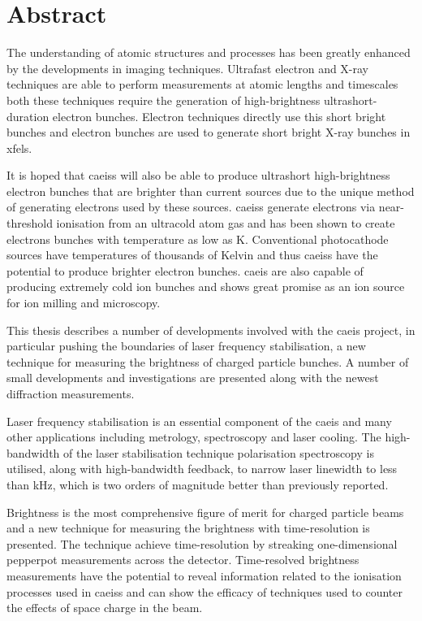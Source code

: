 \chapter*{Abstract}

The understanding of atomic structures and processes has been greatly enhanced by the developments in imaging techniques.
Ultrafast electron and X-ray techniques are able to perform measurements at atomic lengths and timescales both these techniques require the generation of high-brightness ultrashort-duration electron bunches.
Electron techniques directly use this short bright bunches and electron bunches are used to generate short bright X-ray bunches in \glspl{xfel}.

It is hoped that \glspl{caeis} will also be able to produce ultrashort high-brightness electron bunches that are brighter than current sources due to the unique method of generating electrons used by these sources.
\Glspl{caeis} generate electrons via near-threshold ionisation from an ultracold atom gas and has been shown to create electrons bunches with temperature as low as \unit[10]{K}.
Conventional photocathode sources have temperatures of thousands of Kelvin and thus \glspl{caeis} have the potential to produce brighter electron bunches.
\Gls{caeis} are also capable of producing extremely cold ion bunches and shows great promise as an ion source for ion milling and microscopy.

This thesis describes a number of developments involved with the \gls{caeis} project, in particular pushing the boundaries of laser frequency stabilisation, a new technique for measuring the brightness of charged particle bunches.
A number of small developments and investigations are presented along with the newest diffraction measurements.

Laser frequency stabilisation is an essential component of the \gls{caeis} and many other applications including metrology, spectroscopy and laser cooling.
The high-bandwidth of the laser stabilisation technique polarisation spectroscopy is utilised, along with high-bandwidth feedback, to narrow laser linewidth to less than \unit[1]{kHz}, which is two orders of magnitude better than previously reported.

Brightness is the most comprehensive figure of merit for charged particle beams and a new technique for measuring the brightness with time-resolution is presented.
The technique achieve time-resolution by streaking one-dimensional pepperpot measurements across the detector.
Time-resolved brightness measurements have the potential to reveal information related to the ionisation processes used in \glspl{caeis} and can show the efficacy of techniques used to counter the effects of space charge in the beam.

